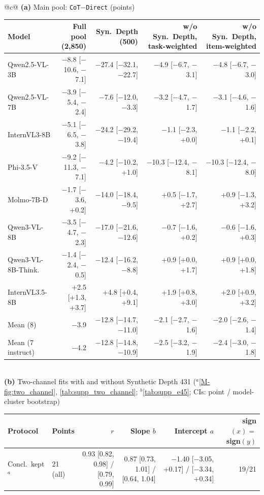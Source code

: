 \begin{tabular}{@{}c@{}}
\textbf{(a)} Main pool: \texttt{CoT}$-$\texttt{Direct} (points) \\[2pt]
\begin{tabular}{lrrrr}
\toprule
Model & Full pool (2,850) & Syn.\ Depth (500) & w/o Syn.\ Depth, task-weighted & w/o Syn.\ Depth, item-weighted \\
\midrule
Qwen2.5-VL-3B & $-$8.8 [$-$10.6, $-$7.1] & $-$27.4 [$-$32.1, $-$22.7] & $-$4.9 [$-$6.7, $-$3.1] & $-$4.8 [$-$6.7, $-$3.0] \\
Qwen2.5-VL-7B & $-$3.9 [$-$5.4, $-$2.4] & $-$7.6 [$-$12.0, $-$3.3] & $-$3.2 [$-$4.7, $-$1.7] & $-$3.1 [$-$4.6, $-$1.6] \\
InternVL3-8B & $-$5.1 [$-$6.5, $-$3.8] & $-$24.2 [$-$29.2, $-$19.4] & $-$1.1 [$-$2.3, +0.0] & $-$1.1 [$-$2.2, +0.1] \\
Phi-3.5-V & $-$9.2 [$-$11.3, $-$7.1] & $-$4.2 [$-$10.2, +1.0] & $-$10.3 [$-$12.4, $-$8.1] & $-$10.3 [$-$12.4, $-$8.0] \\
Molmo-7B-D & $-$1.7 [$-$3.6, +0.2] & $-$14.0 [$-$18.4, $-$9.5] & +0.5 [$-$1.7, +2.7] & +0.9 [$-$1.3, +3.2] \\
Qwen3-VL-8B & $-$3.5 [$-$4.7, $-$2.3] & $-$17.0 [$-$21.6, $-$12.6] & $-$0.7 [$-$1.6, +0.2] & $-$0.6 [$-$1.6, +0.3] \\
Qwen3-VL-8B-Think. & $-$1.4 [$-$2.4, $-$0.5] & $-$12.4 [$-$16.2, $-$8.8] & +0.9 [+0.0, +1.7] & +0.9 [+0.0, +1.8] \\
InternVL3.5-8B & +2.5 [+1.3, +3.7] & +4.8 [+0.4, +9.1] & +1.9 [+0.8, +3.0] & +2.0 [+0.9, +3.2] \\
\midrule
Mean (8) & $-$3.9 & $-$12.8 [$-$14.7, $-$11.0] & $-$2.1 [$-$2.7, $-$1.6] & $-$2.0 [$-$2.6, $-$1.4] \\
Mean (7 instruct) & $-$4.2 & $-$12.8 [$-$14.8, $-$10.9] & $-$2.5 [$-$3.2, $-$1.9] & $-$2.4 [$-$3.0, $-$1.8] \\
\bottomrule
\end{tabular} \\[6pt]
\textbf{(b)} Two-channel fits with and without Synthetic Depth 431 ($^a$\cref{M-fig:two_channel}, \cref{tab:supp_two_channel}; $^b$\cref{tab:supp_e45}; CIs: point / model-cluster bootstrap) \\[2pt]
\begin{tabular}{llrrrr}
\toprule
Protocol & Points & $r$ & Slope $b$ & Intercept $a$ & sign$(x)=$sign$(y)$ \\
\midrule
Concl.\ kept$^a$ & 21 (all) & 0.93 [0.82, 0.98] / [0.79, 0.99] & 0.87 [0.73, 1.01] / [0.64, 1.04] & $-$1.40 [$-$3.05, +0.17] / [$-$3.34, +0.34] & 19/21 \\

\end{tabular}
\end{tabular}

